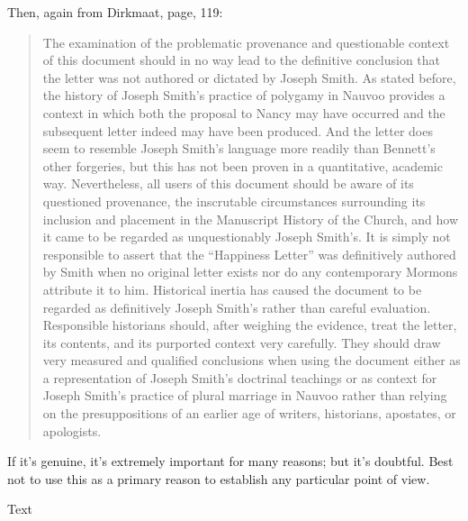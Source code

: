 				Then, again from Dirkmaat, page, 119:
				
				\begin{quote}
					The examination of the problematic provenance and questionable context of this document should in no way lead to the definitive conclusion that the letter was not authored or dictated by Joseph Smith. As stated before, the history of Joseph Smith's practice of polygamy in Nauvoo provides a context in which both the proposal to Nancy may have occurred and the subsequent letter indeed may have been produced. And the letter does seem to resemble Joseph Smith's language more readily than Bennett's other forgeries, but this has not been proven in a quantitative, academic way. Nevertheless, all users of this document should be aware of its questioned provenance, the inscrutable circumstances surrounding its inclusion and placement in the Manuscript History of the Church, and how it came to be regarded as unquestionably Joseph Smith's. It is simply not responsible to assert that the ``Happiness Letter'' was definitively authored by Smith when no original letter exists nor do any contemporary Mormons attribute it to him. Historical inertia has caused the document to be regarded as definitively Joseph Smith's rather than careful evaluation. Responsible historians should, after weighing the evidence, treat the letter, its contents, and its purported context very carefully. They should draw very measured and qualified conclusions when using the document either as a representation of Joseph Smith's doctrinal teachings or as context for Joseph Smith's practice of plural marriage in Nauvoo rather than relying on the presuppositions of an earlier age of writers, historians, apostates, or apologists. 
				\end{quote}
				
				If it's genuine, it's extremely important for many reasons; but it's doubtful. Best not to use this as a primary reason to establish any particular point of view.
			
			
			\begin{description}
				\item[Text]
			\end{description}
			
